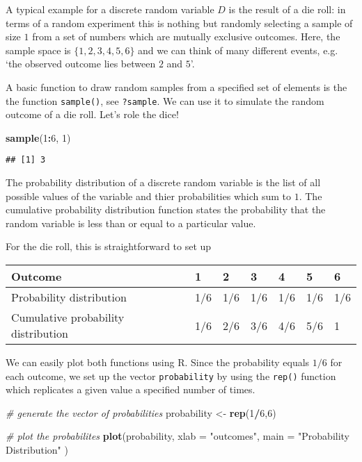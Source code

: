 \documentclass[]{book}
\newenvironment{Shaded}{\begin{snugshade}}{\end{snugshade}}
\newcommand{\KeywordTok}[1]{\textcolor[rgb]{0.13,0.29,0.53}{\textbf{#1}}}
\newcommand{\DataTypeTok}[1]{\textcolor[rgb]{0.13,0.29,0.53}{#1}}
\newcommand{\DecValTok}[1]{\textcolor[rgb]{0.00,0.00,0.81}{#1}}
\newcommand{\StringTok}[1]{\textcolor[rgb]{0.31,0.60,0.02}{#1}}
\newcommand{\CommentTok}[1]{\textcolor[rgb]{0.56,0.35,0.01}{\textit{#1}}}
\newcommand{\OperatorTok}[1]{\textcolor[rgb]{0.81,0.36,0.00}{\textbf{#1}}}
\newcommand{\NormalTok}[1]{#1}
\theoremstyle{definition}
\theoremstyle{definition}
\theoremstyle{definition}
\theoremstyle{remark}
\begin{document}
A typical example for a discrete random variable \(D\) is the result of
a die roll: in terms of a random experiment this is nothing but randomly
selecting a sample of size \(1\) from a set of numbers which are
mutually exclusive outcomes. Here, the sample space is
\(\{1,2,3,4,5,6\}\) and we can think of many different events, e.g. `the
observed outcome lies between \(2\) and \(5\)'.

A basic function to draw random samples from a specified set of elements
is the the function \texttt{sample()}, see \texttt{?sample}. We can use
it to simulate the random outcome of a die roll. Let's role the dice!

\begin{Shaded}
\begin{Highlighting}[]
\KeywordTok{sample}\NormalTok{(}\DecValTok{1}\OperatorTok{:}\DecValTok{6}\NormalTok{, }\DecValTok{1}\NormalTok{) }
\end{Highlighting}
\end{Shaded}

\begin{verbatim}
## [1] 3
\end{verbatim}

The probability distribution of a discrete random variable is the list
of all possible values of the variable and thier probabilities which sum
to \(1\). The cumulative probability distribution function states the
probability that the random variable is less than or equal to a
particular value.

For the die roll, this is straightforward to set up

\begin{longtable}[]{@{}lllllll@{}}
\toprule
Outcome & 1 & 2 & 3 & 4 & 5 & 6\tabularnewline
\midrule
\endhead
Probability distribution & 1/6 & 1/6 & 1/6 & 1/6 & 1/6 &
1/6\tabularnewline
Cumulative probability distribution & 1/6 & 2/6 & 3/6 & 4/6 & 5/6 &
1\tabularnewline
\bottomrule
\end{longtable}

We can easily plot both functions using R. Since the probability equals
\(1/6\) for each outcome, we set up the vector \texttt{probability} by
using the \texttt{rep()} function which replicates a given value a
specified number of times.

\begin{Shaded}
\begin{Highlighting}[]
\CommentTok{# generate the vector of probabilities }
\NormalTok{probability <-}\StringTok{ }\KeywordTok{rep}\NormalTok{(}\DecValTok{1}\OperatorTok{/}\DecValTok{6}\NormalTok{,}\DecValTok{6}\NormalTok{) }

\CommentTok{# plot the probabilites }
\KeywordTok{plot}\NormalTok{(probability, }\DataTypeTok{xlab =} \StringTok{"outcomes"}\NormalTok{, }
     \DataTypeTok{main =} \StringTok{"Probability Distribution"}
\NormalTok{     ) }
\end{Highlighting}
\end{Shaded}
\end{document}
